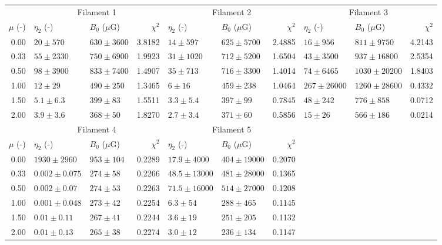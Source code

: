 \begin{tabular}{@{}rllr llr llr@{}}

\toprule
{} & \multicolumn{3}{c}{Filament 1}
   & \multicolumn{3}{c}{Filament 2}
   & \multicolumn{3}{c}{Filament 3} \\
\cmidrule(lr){2-4} \cmidrule(lr){5-7} \cmidrule(lr){8-10}
$\mu$ (-) & $\eta_2$ (-) & $B_0$ ($\mu$G) & $\chi^2$
          & $\eta_2$ (-) & $B_0$ ($\mu$G) & $\chi^2$
          & $\eta_2$ (-) & $B_0$ ($\mu$G) & $\chi^2$ \\

\midrule
0.00 & ${20} \pm 570$ & ${630} \pm 3600$ & 3.8182
     & ${14} \pm 597$ & ${625} \pm 5700$ & 2.4885
     & $16 \pm 956$ & $811 \pm 9750$ & 4.2143\\
0.33 & ${55} \pm 2330$ & ${750} \pm 6900$ & 1.9923
     & ${31} \pm 1020$ & ${712} \pm 5200$ & 1.6504
     & $43 \pm 3500$ & $937 \pm 16800$ & 2.5354\\
0.50 & ${98} \pm 3900$ & ${833} \pm 7400$ & 1.4907
     & ${35} \pm 713$ & ${716} \pm 3300$ & 1.4014
     & $74 \pm 6465$ & $1030 \pm 20200$ & 1.8403\\
1.00 & ${12} \pm 29$ & ${490} \pm 250$ & 1.3465
     & ${6} \pm 16$ & ${459} \pm 238$ & 1.0464
     & $267 \pm 26000$ & $1260 \pm 28600$ & 0.4332\\
1.50 & ${5.1} \pm 6.3$ & ${399} \pm 83$ & 1.5511
     & ${3.3} \pm 5.4$ & ${397} \pm 99$ & 0.7845
     & $48 \pm 242$ & $776 \pm 858$ & 0.0712\\
2.00 & ${3.9} \pm 3.6$ & ${368} \pm 50$ & 1.8270
     & ${2.7} \pm 3.4$ & ${371} \pm 60$ & 0.5856
     & $15 \pm 26$ & $566 \pm 186$ & 0.0214\\

\midrule
{} & \multicolumn{3}{c}{Filament 4}
   & \multicolumn{3}{c}{Filament 5} \\
\cmidrule(lr){2-4} \cmidrule(lr){5-7}
$\mu$ (-) & $\eta_2$ (-) & $B_0$ ($\mu$G) & $\chi^2$
          & $\eta_2$ (-) & $B_0$ ($\mu$G) & $\chi^2$ \\

\cmidrule(lr){1-7}
0.00 & $1930 \pm 2960$ & $953 \pm 104$ & 0.2289
     & $17.9 \pm 4000$ & $404 \pm 19000$ & 0.2070\\
0.33 & ${0.002} \pm 0.075$ & ${274} \pm 58$ & 0.2266
     & $48.5 \pm 13000$ & $481 \pm 28000$ & 0.1365\\
0.50 & ${0.002} \pm 0.07$ & ${274} \pm 53$ & 0.2263
     & $71.5 \pm 16000$ & $514 \pm 27000$ & 0.1208\\
1.00 & ${0.001} \pm 0.048$ & ${273} \pm 42$ & 0.2254
     & $6.3 \pm 54$ & $288 \pm 465$ & 0.1145\\
1.50 & ${0.01} \pm 0.11$ & ${267} \pm 41$ & 0.2244
     & $3.6 \pm 19$ & $251 \pm 205$ & 0.1132\\
2.00 & ${0.01} \pm 0.13$ & ${265} \pm 38$ & 0.2274
     & $3.0 \pm 12$ & $236 \pm 134$ & 0.1147\\

\bottomrule
\end{tabular} 
